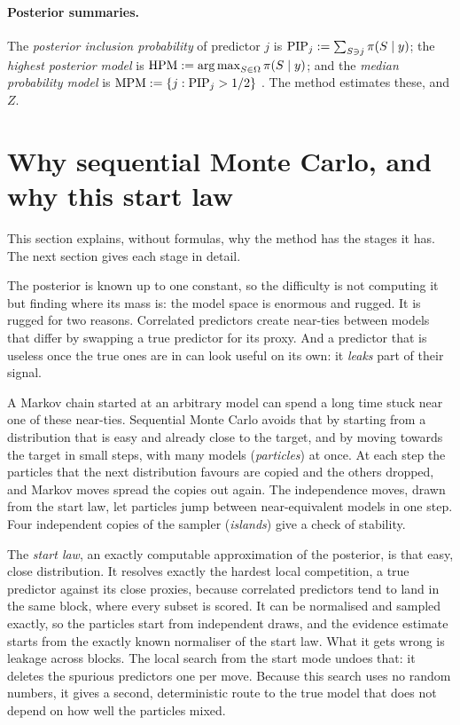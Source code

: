 \documentclass[11pt]{article}
\begin{document}
\paragraph{Posterior summaries.} The \emph{posterior inclusion probability} of predictor $j$ is
$\mathrm{PIP}_j:=\sum_{S\ni j}\pi(S\mid y)$; the \emph{highest posterior model} is $\mathrm{HPM}:=\operatorname*{arg\,max}_{S\in\Omega}\pi(S\mid y)$; and the
\emph{median probability model} is $\mathrm{MPM}:=\{j:\mathrm{PIP}_j>1/2\}$ \citep{BarbieriBerger2004}. The method estimates these, and
$Z$.

\section{Why sequential Monte Carlo, and why this start law}\label{sec:m-intuition}

This section explains, without formulas, why the method has the stages it has. The next section gives each stage in
detail.

The posterior is known up to one constant, so the difficulty is not computing it but finding where its mass is: the
model space is enormous and rugged. It is rugged for two reasons. Correlated predictors create near-ties between models
that differ by swapping a true predictor for its proxy. And a predictor that is useless once the true ones are in can look
useful on its own: it \emph{leaks} part of their signal.

A Markov chain started at an arbitrary model can spend a long time stuck near one of these near-ties. Sequential Monte
Carlo avoids that by starting from a distribution that is easy and already close to the target, and by moving towards the
target in small steps, with many models (\emph{particles}) at once. At each step the particles that the next distribution
favours are copied and the others dropped, and Markov moves spread the copies out again. The independence moves, drawn
from the start law, let particles jump between near-equivalent models in one step. Four independent copies of the sampler
(\emph{islands}) give a check of stability.

The \emph{start law}, an exactly computable approximation of the posterior, is that easy, close distribution. It resolves exactly the hardest local competition, a true predictor
against its close proxies, because correlated predictors tend to land in the same block, where every subset is scored.
It can be normalised and sampled exactly, so the particles start from independent draws, and the evidence estimate starts
from the exactly known normaliser of the start law. What it gets wrong is leakage across blocks. The local search from the start mode undoes that: it deletes
the spurious predictors one per move. Because this search uses no random numbers, it gives a second, deterministic route
to the true model that does not depend on how well the particles mixed.
\end{document}

